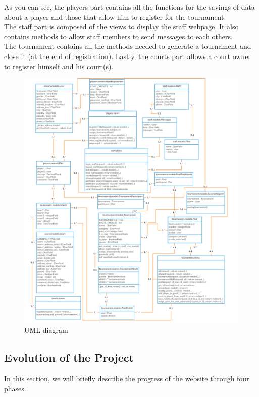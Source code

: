 \documentclass[a4paper, 12pt]{article}
\begin{document}
As you can see, the players part contains all the functions for the savings of data about a player and those that allow him to register for the tournament.\\

The staff part is composed of the views to display the staff webpage. It also contains methods to allow staff members to send messages to each others.\\

The tournament contains all the methods needed to generate a tournament and close it (at the end of registration).
Lastly, the courts part allows a court owner to register himself and his court(s).\\
\begin{figure}[h]
	\centering
 	\caption{\label{uml} UML diagram}
	\includegraphics[scale=0.2]{Class.png}
\end{figure}
\FloatBarrier

\subsection{Evolution of the Project}

In this section, we will briefly describe the progress of the website through four phases.\\
\end{document}
